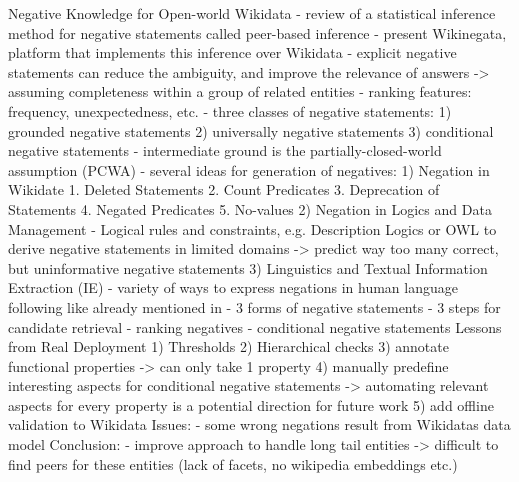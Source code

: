 \cite{arnaout2021negative}
Negative Knowledge for Open-world Wikidata
- review of a statistical inference method for negative statements called peer-based inference
- present Wikinegata, platform that implements this inference over Wikidata
- explicit negative statements can reduce the ambiguity, and improve the relevance of answers
-> assuming completeness within a group of related entities
- ranking features: frequency, unexpectedness, etc.
- three classes of negative statements: 
    1) grounded negative statements
    2) universally negative statements
    3) conditional negative statements
- intermediate ground is the partially-closed-world assumption (PCWA)
- several ideas for generation of negatives:
    1) Negation in Wikidate
        1. Deleted Statements
        2. Count Predicates
        3. Deprecation of Statements
        4. Negated Predicates
        5. No-values
    2) Negation in Logics and Data Management
        - Logical rules and constraints, e.g. Description Logics or OWL to derive negative statements in limited domains
       -> predict way too many correct, but uninformative negative statements
    3) Linguistics and Textual Information Extraction (IE)
        - variety of ways to express negations in human language
following like already mentioned in \cite{arnaout2020negative}
- 3 forms of negative statements
- 3 steps for candidate retrieval
- ranking negatives
- conditional negative statements
Lessons from Real Deployment
1) Thresholds
2) Hierarchical checks
3) annotate functional properties -> can only take 1 property
4) manually predefine interesting aspects for conditional negative statements
    -> automating relevant aspects for every property is a potential direction for future work
5) add offline validation to Wikidata
Issues:
- some wrong negations result from Wikidatas data model
Conclusion:
- improve approach to handle long tail entities -> difficult to find peers for these entities
(lack of facets, no wikipedia embeddings etc.)


